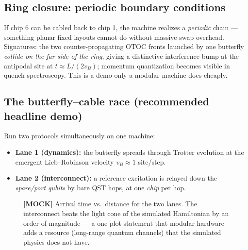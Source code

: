 \documentclass[11pt]{article}
\begin{document}
\subsection{Ring closure: periodic boundary conditions}
If chip 6 can be cabled back to chip 1, the machine realizes a
\emph{periodic} chain --- something planar fixed layouts cannot do without
massive swap overhead. Signatures: the two counter-propagating OTOC fronts
launched by one butterfly \emph{collide on the far side of the ring}, giving
a distinctive interference bump at the antipodal site at
$t \approx L/(2v_B)$; momentum quantization becomes visible in quench
spectroscopy. This is a demo only a modular machine does cheaply.

\subsection{The butterfly--cable race (recommended headline demo)}
\label{sec:race}
Run two protocols simultaneously on one machine:
\begin{itemize}
  \item \textbf{Lane 1 (dynamics):} the butterfly spreads through Trotter
  evolution at the emergent Lieb--Robinson velocity $v_B \approx 1$
  site/step.
  \item \textbf{Lane 2 (interconnect):} a reference excitation is relayed down
  the \emph{spare/port qubits} by bare QST hops, at one \emph{chip} per hop.
\end{itemize}

\begin{figure}[h]
\centering
{}
\caption{\textbf{[MOCK]} Arrival time vs.\ distance for the two lanes. The
interconnect beats the light cone of the simulated Hamiltonian by an order of
magnitude --- a one-plot statement that modular hardware adds a resource
(long-range quantum channels) that the simulated physics does not have.}
\label{fig:race}
\end{figure}
\end{document}
